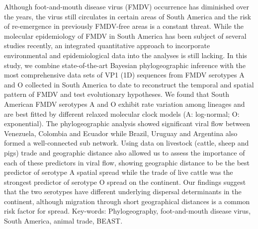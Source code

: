 \documentclass[10pt]{article}
\begin{document}
Although foot-and-mouth disease virus (FMDV) occurrence has diminished over the years, the virus still circulates in certain areas of South America and the risk of re-emergence in previously FMDV-free areas is a constant threat.
While the molecular epidemiology of FMDV in South America has been subject of several studies recently, an integrated quantitative approach to incorporate environmental and epidemiological data into the analyses is still lacking.
In this study, we combine state-of-the-art Bayesian phylogeographic inference with the most comprehensive data sets of VP1 (1D) sequences from FMDV serotypes A and O collected in South America to date  to  reconstruct the temporal and spatial pattern of FMDV and test evolutionary hypotheses.
We found that South American FMDV serotypes A and O exhibit rate variation among lineages and are best fitted by different relaxed molecular clock models (A: log-normal; O: exponential).
The phylogeographic analysis showed significant viral flow between Venezuela, Colombia and Ecuador while Brazil, Uruguay and Argentina also formed a well-connected sub network.
Using data on livestock (cattle, sheep and pigs) trade and geographic distance also allowed us to assess the importance of each of these predictors in viral flow, showing geographic distance to be the best predictor of serotype A spatial spread while the trade of live cattle was the strongest predictor of serotype O spread on the continent.
Our findings suggest that the two serotypes have different underlying dispersal determinants in the continent, although migration through short geographical distances is a common risk factor for spread.  
Key-words: Phylogeography, foot-and-mouth disease virus, South America, animal trade, BEAST.
\end{document}
